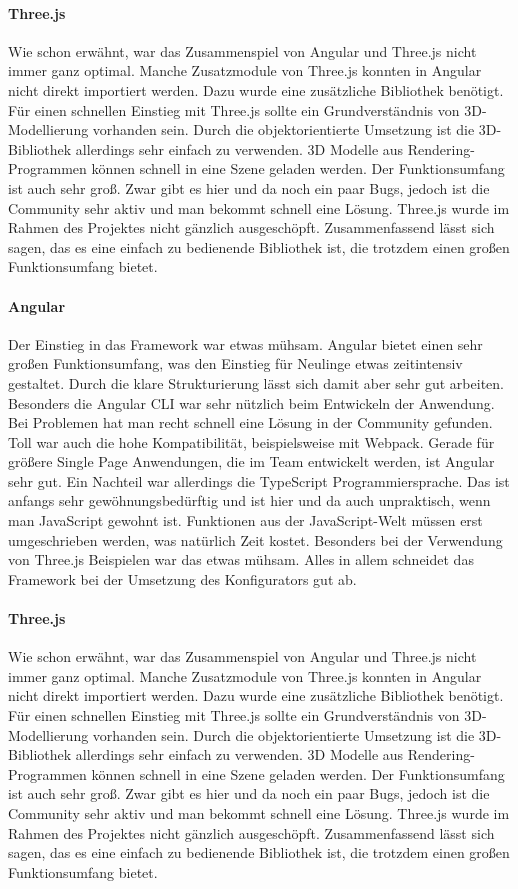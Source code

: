 \paragraph{Three.js}
Wie schon erwähnt, war das Zusammenspiel von Angular und Three.js nicht immer ganz optimal. Manche Zusatzmodule von Three.js konnten in Angular nicht direkt importiert werden. Dazu wurde eine zusätzliche Bibliothek benötigt. Für einen schnellen Einstieg mit Three.js sollte ein Grundverständnis von 3D-Modellierung vorhanden sein. Durch die objektorientierte Umsetzung ist die 3D-Bibliothek allerdings sehr einfach zu verwenden. 3D Modelle aus Rendering-Programmen können schnell in eine Szene geladen werden. Der Funktionsumfang ist auch sehr groß. Zwar gibt es hier und da noch ein paar Bugs, jedoch ist die Community sehr aktiv und man bekommt schnell eine Lösung. Three.js wurde im Rahmen des Projektes nicht gänzlich ausgeschöpft. Zusammenfassend lässt sich sagen, das es eine einfach zu bedienende Bibliothek ist, die trotzdem einen großen Funktionsumfang bietet.
\paragraph{Angular}
Der Einstieg in das Framework war etwas mühsam. Angular bietet einen sehr großen Funktionsumfang, was den Einstieg für Neulinge etwas zeitintensiv gestaltet. Durch die klare Strukturierung lässt sich damit aber sehr gut arbeiten. Besonders die Angular CLI war sehr nützlich beim Entwickeln der Anwendung. Bei Problemen hat man recht schnell eine Lösung in der Community gefunden. Toll war auch die hohe Kompatibilität, beispielsweise mit Webpack. Gerade für größere Single Page Anwendungen, die im Team entwickelt werden, ist Angular sehr gut. Ein Nachteil war allerdings die TypeScript Programmiersprache. Das ist anfangs sehr gewöhnungsbedürftig und ist hier und da auch unpraktisch, wenn man JavaScript gewohnt ist. Funktionen aus der JavaScript-Welt müssen erst umgeschrieben werden, was natürlich Zeit kostet. Besonders bei der Verwendung von Three.js Beispielen war das etwas mühsam. Alles in allem schneidet das Framework bei der Umsetzung des Konfigurators gut ab.
\paragraph{Three.js}
Wie schon erwähnt, war das Zusammenspiel von Angular und Three.js nicht immer ganz optimal. Manche Zusatzmodule von Three.js konnten in Angular nicht direkt importiert werden. Dazu wurde eine zusätzliche Bibliothek benötigt. Für einen schnellen Einstieg mit Three.js sollte ein Grundverständnis von 3D-Modellierung vorhanden sein. Durch die objektorientierte Umsetzung ist die 3D-Bibliothek allerdings sehr einfach zu verwenden. 3D Modelle aus Rendering-Programmen können schnell in eine Szene geladen werden. Der Funktionsumfang ist auch sehr groß. Zwar gibt es hier und da noch ein paar Bugs, jedoch ist die Community sehr aktiv und man bekommt schnell eine Lösung. Three.js wurde im Rahmen des Projektes nicht gänzlich ausgeschöpft. Zusammenfassend lässt sich sagen, das es eine einfach zu bedienende Bibliothek ist, die trotzdem einen großen Funktionsumfang bietet.
